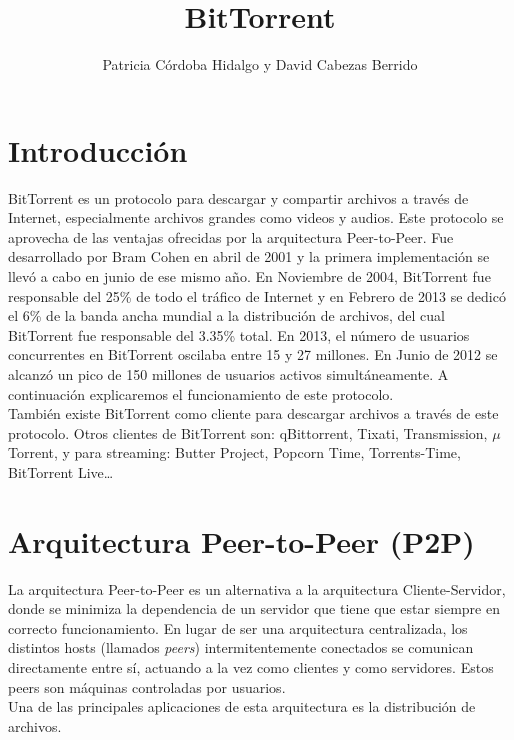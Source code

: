 \documentclass{article}
\begin{document}
\title{\Huge BitTorrent}
\author{Patricia Córdoba Hidalgo y David Cabezas Berrido}
\date{}
\maketitle

\tableofcontents
\newpage

\section{Introducción}

BitTorrent es un protocolo para descargar y compartir archivos a
través de Internet, especialmente archivos grandes como videos y
audios. Este protocolo se aprovecha de las ventajas ofrecidas por la
arquitectura Peer-to-Peer. Fue desarrollado por Bram Cohen en abril de
2001 y la primera implementación se llevó a cabo en junio de ese mismo
año.
En Noviembre de 2004, BitTorrent fue responsable del 25\% de todo el tráfico de Internet y en Febrero de 2013 se dedicó el 6\% de la banda ancha mundial a la distribución de archivos, del cual BitTorrent fue responsable del 3.35\% total. En 2013, el número de usuarios concurrentes en BitTorrent oscilaba entre 15 y 27 millones. En Junio de 2012 se alcanzó un pico de 150 millones de usuarios activos simultáneamente. A continuación explicaremos el funcionamiento de este protocolo.\\

También existe BitTorrent como cliente para descargar archivos a
través de este protocolo. Otros clientes de BitTorrent son:
qBittorrent, Tixati, Transmission, $\mu$Torrent, y para streaming:
Butter Project, Popcorn Time, Torrents-Time, BitTorrent Live\ldots

\section{Arquitectura Peer-to-Peer (P2P)}

La arquitectura Peer-to-Peer es un alternativa a la arquitectura
Cliente-Servidor, donde se minimiza la dependencia de un servidor que
tiene que estar siempre en correcto funcionamiento. En lugar de ser
una arquitectura centralizada, los distintos hosts (llamados \textit{peers}) intermitentemente conectados se comunican directamente entre sí, actuando a la vez como clientes y como servidores. Estos peers son máquinas controladas por usuarios.\\

Una de las principales aplicaciones de esta arquitectura es la
distribución de archivos.
\end{document}
